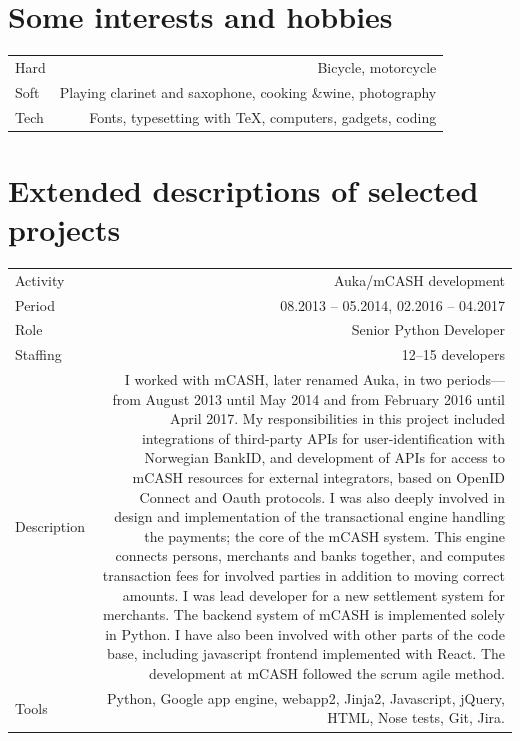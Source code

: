 \documentclass[english,a4paper,11pt]{article}
\begin{document}
\Needspace{\cvneedspaceconst\baselineskip}
\section*{Some interests and hobbies}
\begin{longtable}{LR}
Hard & Bicycle, motorcycle\\ 
Soft & Playing clarinet and saxophone, cooking \&wine, photography\\ 
Tech & Fonts, typesetting with \TeX, computers, gadgets, coding\\ 
\end{longtable}

\Needspace{\cvneedspaceconst\baselineskip}
\section*{Extended descriptions of selected projects}
\begin{longtable}{@{}LR}
Activity & Auka/mCASH development \\ 
Period & 08.2013 -- 05.2014, 02.2016 -- 04.2017 \\ 
Role & Senior Python Developer \\ 
Staffing & 12--15 developers \\ 
Description & I worked with mCASH, later renamed Auka, in two periods---from August 2013 until May 2014 and from February 2016 until April 2017. My responsibilities in this project included integrations of third-party APIs for user-identification with Norwegian BankID, and development of APIs for access to mCASH resources for external integrators, based on OpenID Connect and Oauth protocols. I was also deeply involved in design and implementation of the transactional engine handling the payments; the core of the mCASH system. This engine connects persons, merchants and banks together, and computes transaction fees for involved parties in addition to moving correct amounts. I was lead developer for a new settlement system for merchants. The backend system of mCASH is implemented solely in Python. I have also been involved with other parts of the code base, including javascript frontend implemented with React. The development at mCASH followed the scrum agile method. \\ 
Tools & Python, Google app engine, webapp2, Jinja2, Javascript, jQuery, HTML, Nose tests, Git, Jira. \\ 
\end{longtable}
\end{document}
